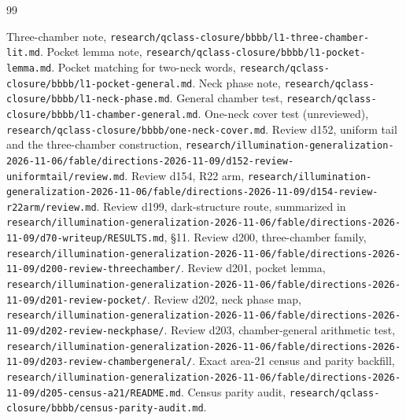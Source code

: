 \documentclass[11pt]{article}
\theoremstyle{definition}
\theoremstyle{remark}
\newcommand{\repopath}[1]{\nolinkurl{#1}}
\begin{document}
\begin{thebibliography}{99}\raggedright
{} Three-chamber note,
\repopath{research/qclass-closure/bbbb/l1-three-chamber-lit.md}.
 Pocket lemma note,
\repopath{research/qclass-closure/bbbb/l1-pocket-lemma.md}.
 Pocket matching for two-neck words,
\repopath{research/qclass-closure/bbbb/l1-pocket-general.md}.
 Neck phase note,
\repopath{research/qclass-closure/bbbb/l1-neck-phase.md}.
 General chamber test,
\repopath{research/qclass-closure/bbbb/l1-chamber-general.md}.
 One-neck cover test (unreviewed),
\repopath{research/qclass-closure/bbbb/one-neck-cover.md}.
 Review d152, uniform tail and the three-chamber construction,
\repopath{research/illumination-generalization-2026-11-06/fable/directions-2026-11-09/d152-review-uniformtail/review.md}.
 Review d154, R22 arm,
\repopath{research/illumination-generalization-2026-11-06/fable/directions-2026-11-09/d154-review-r22arm/review.md}.
 Review d199, dark-structure route, summarized in
\repopath{research/illumination-generalization-2026-11-06/fable/directions-2026-11-09/d70-writeup/RESULTS.md}, \S 11.
 Review d200, three-chamber family,
\repopath{research/illumination-generalization-2026-11-06/fable/directions-2026-11-09/d200-review-threechamber/}.
 Review d201, pocket lemma,
\repopath{research/illumination-generalization-2026-11-06/fable/directions-2026-11-09/d201-review-pocket/}.
 Review d202, neck phase map,
\repopath{research/illumination-generalization-2026-11-06/fable/directions-2026-11-09/d202-review-neckphase/}.
 Review d203, chamber-general arithmetic test,
\repopath{research/illumination-generalization-2026-11-06/fable/directions-2026-11-09/d203-review-chambergeneral/}.
 Exact area-21 census and parity backfill,
\repopath{research/illumination-generalization-2026-11-06/fable/directions-2026-11-09/d205-census-a21/README.md}.
 Census parity audit,
\repopath{research/qclass-closure/bbbb/census-parity-audit.md}.
\end{thebibliography}
\end{document}
